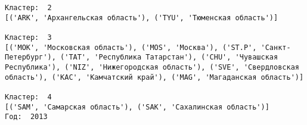 \documentclass[11pt]{article}
\begin{document}
\begin{Verbatim}[commandchars=\\\{\}]
Кластер:  2
[('ARK', 'Архангельская область'), ('TYU', 'Тюменская область')]

Кластер:  3
[('MOK', 'Московская область'), ('MOS', 'Москва'), ('ST.P', 'Санкт-Петербург'), ('TAT', 'Республика Татарстан'), ('CHU', 'Чувашская Республика'), ('NIZ', 'Нижегородская область'), ('SVE', 'Свердловская область'), ('KAC', 'Камчатский край'), ('MAG', 'Магаданская область')]

Кластер:  4
[('SAM', 'Самарская область'), ('SAK', 'Сахалинская область')]
Год:  2013

    \end{Verbatim}

    \begin{center}
    \end{center}
    { \hspace*{\fill} \\}
    
\end{document}
